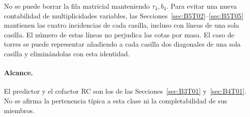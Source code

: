 No se puede borrar la fila matricial manteniendo $\tau_4,b_4$. Para evitar una nueva contabilidad
de multiplicidades variables, las Secciones~\ref{sec:B5T02}--\ref{sec:B5T05} mantienen las cuatro
incidencias de cada casilla, incluso con líneas de una sola casilla. El número de estas líneas no
perjudica las cotas por masa. El caso de torres se puede representar añadiendo a cada casilla dos
diagonales de una sola casilla y eliminándolas con esta identidad.

\paragraph{Alcance.}
El predictor y el cofactor RC son los de las Secciones~\ref{sec:B3T01} y~\ref{sec:B4T01}.
No se afirma la pertenencia típica a esta clase ni la completabilidad de sus miembros.

